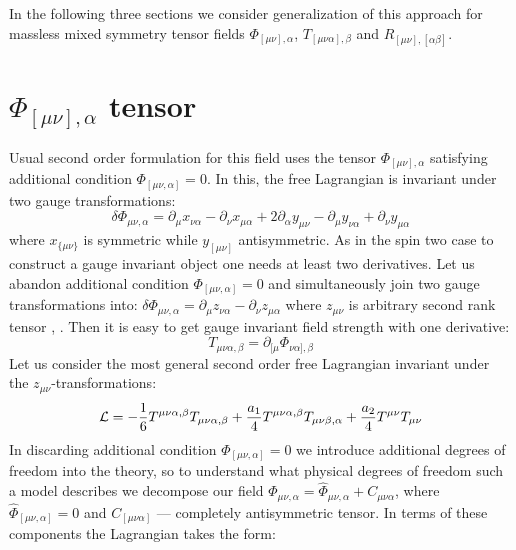 \documentclass[a4paper,12pt]{article}
\begin{document}
In the following three sections we consider generalization of this
approach for massless mixed symmetry tensor fields
$\Phi_{[\mu\nu],\alpha}$, $T_{[\mu\nu\alpha],\beta}$ and
$R_{[\mu\nu],[\alpha\beta]}$.

\section{$\Phi_{[\mu\nu],\alpha}$ tensor}

Usual second order formulation for this field uses the tensor
$\Phi_{[\mu\nu],\alpha}$ satisfying additional condition
$\Phi_{[\mu\nu,\alpha]} = 0$. In this, the free Lagrangian is
invariant under two gauge transformations:
$$
\delta \Phi_{\mu\nu,\alpha} = \partial_\mu x_{\nu\alpha} -
\partial_\nu x_{\mu\alpha} + 2 \partial_\alpha y_{\mu\nu} -
\partial_\mu y_{\nu\alpha} + \partial_\nu y_{\mu\alpha}
$$
where $x_{\{\mu\nu\}}$ is symmetric while $y_{[\mu\nu]}$
antisymmetric. As in the spin two case to construct a gauge invariant
object one needs at least two derivatives. Let us abandon additional
condition $\Phi_{[\mu\nu,\alpha]} = 0$ and simultaneously join two
gauge transformations into:
$\delta \Phi_{\mu\nu,\alpha} = \partial_\mu z_{\nu\alpha} -
\partial_\nu z_{\mu\alpha}$
where $z_{\mu\nu}$ is arbitrary second rank tensor \cite{BCNS02},
\cite{BCCSS03}. Then it is easy to get gauge invariant field strength
with one derivative:
$$
T_{\mu\nu\alpha,\beta} = \partial_{[\mu} \Phi_{\nu\alpha],\beta}
$$
Let us consider the most general second order free Lagrangian
invariant under the $z_{\mu\nu}$-transformations:
\begin{equation}
{\cal L} = - \frac{1}{6} T^{\mu\nu\alpha,\beta} T_{\mu\nu\alpha,\beta}
+ \frac{a_1}{4} T^{\mu\nu\alpha,\beta} T_{\mu\nu\beta,\alpha} +
\frac{a_2}{4} T^{\mu\nu} T_{\mu\nu}
\end{equation}
In discarding additional condition $\Phi_{[\mu\nu,\alpha]} = 0$ we
introduce additional degrees of freedom into the theory, so to
understand what physical degrees of freedom such a model describes we
decompose our field
$\Phi_{\mu\nu,\alpha} = \hat{\Phi}_{\mu\nu,\alpha} +
C_{\mu\nu\alpha}$, where $\hat{\Phi}_{[\mu\nu,\alpha]} = 0$ and
$C_{[\mu\nu\alpha]}$ --- completely antisymmetric tensor. In terms of
these components the Lagrangian takes the form:
\end{document}
